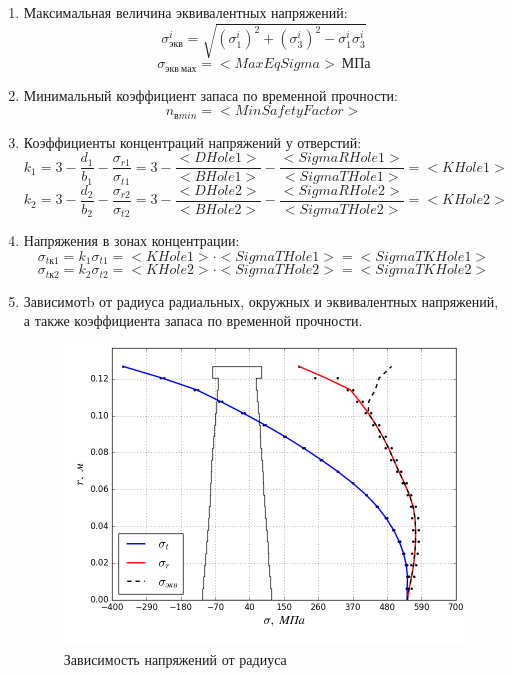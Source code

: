 \documentclass[a4paper,10pt]{article}
\begin{document}
\begin{enumerate}
\item Максимальная величина эквивалентных напряжений:
\[\sigma_{экв}^i = \sqrt{(\sigma_1^i)^2 + (\sigma_3^i)^2 - \sigma_1^i \sigma_3^i}\]
\[\sigma_{экв\ мах} = <MaxEqSigma>\ МПа\]
\item Минимальный коэффициент запаса по временной прочности:
\[n_{в min} = <MinSafetyFactor>\]
\item Коэффициенты концентраций напряжений у отверстий:
\[k_1 = 3 - \frac{d_1}{b_1} - \frac{\sigma_{r1}}{\sigma_{t1}} = 
3 - \frac{<DHole1>}{<BHole1>} - \frac{<SigmaRHole1>}{<SigmaTHole1>} = <KHole1>\]
\[k_2 = 3 - \frac{d_2}{b_2} - \frac{\sigma_{r2}}{\sigma_{t2}} = 
3 - \frac{<DHole2>}{<BHole2>} - \frac{<SigmaRHole2>}{<SigmaTHole2>} = <KHole2>\]
\item Напряжения в зонах концентрации:
\[\sigma_{tк1} = k_1 \sigma_{t1} = <KHole1> \cdot <SigmaTHole1> = <SigmaTKHole1>\]
\[\sigma_{tк2} = k_2 \sigma_{t2} = <KHole2> \cdot <SigmaTHole2> = <SigmaTKHole2>\]
\item Зависимотb от радиуса радиальных, окружных и эквивалентных напряжений, а также коэффициента запаса по временной прочности.
\begin{figure}[hbtp]
\centering
\includegraphics[scale=0.7]{../../strength_calculation/output/StressPlot.png}
\caption{Зависимость напряжений от радиуса}
\end{figure}
\begin{figure}[hbtp]
\centering

\end{figure}
\end{enumerate}
\end{document}
